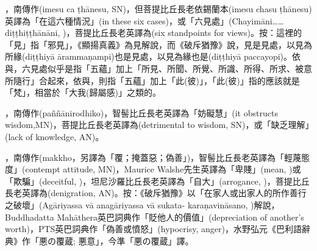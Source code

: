 \startitemgroup[noteitems]
\item{}，南傳作(imesu ca ṭhānesu, SN)，但菩提比丘長老依錫蘭本(imesu chasu ṭhānesu)英譯為「在這六種情況」(in these six cases)，或「六見處」(Chayimāni……diṭṭhiṭṭhānāni, )，菩提比丘長老英譯為(six standpoints for views)。按：這裡的「見」指「邪見」，《顯揚真義》為見解說，而《破斥猶豫》說，見是見處，以見為所緣(diṭṭhiyā ārammaṇampi)也是見處，以見為緣也是(diṭṭhiyā paccayopi)。依與，六見處似乎是指「五蘊」加上「所見、所聞、所覺、所識、所得、所求、被意所隨行」合起來，依與，則指「五蘊」加上「此(彼)」，「此(彼)」指的應該就是「梵」，相當於「大我(歸屬感)」之類的。
\stopitemgroup

\startitemgroup[noteitems]
\item{}，南傳作(paññānirodhiko)，智髻比丘長老英譯為「妨礙慧」(it obstructs wisdom,MN)，菩提比丘長老英譯為(detrimental to wisdom, SN)，或「缺乏理解」(lack of knowledge, AN)。
\stopitemgroup

\startitemgroup[noteitems]
\item{}，南傳作(makkho，另譯為「覆；掩蓋惡；偽善」)，智髻比丘長老英譯為「輕蔑態度」(contempt attitude, MN)，Maurice Walshe先生英譯為「卑賤」(mean, )或「欺騙」(deceitful, )，坦尼沙羅比丘長老英譯為「自大」(arrogance, )，菩提比丘長老英譯為(denigration, AN)。按：《破斥猶豫》以「在家人或出家人的所作善行之破壞」(Agāriyassa vā anagāriyassa vā sukata- karaṇavināsano, )解說，Buddhadatta Mahāthera英巴詞典作「貶他人的價值」(depreciation of another's worth)，PTS英巴詞典作「偽善或憤怒」(hypocrisy, anger)，水野弘元《巴利語辭典》作「悪の覆蔵; 悪意」，今準「悪の覆蔵」譯。
\stopitemgroup

